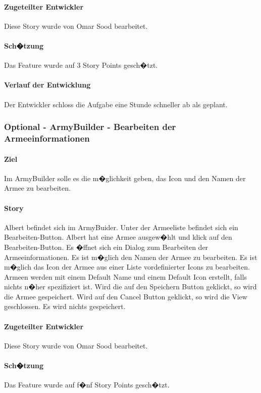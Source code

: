 \documentclass[12pt, titlepage]{scrartcl}
\begin{document}
			\paragraph{Zugeteilter Entwickler} Diese Story wurde von Omar Sood bearbeitet.
			\paragraph{Sch�tzung}
			Das Feature wurde auf 3 Story Points gesch�tzt.
			\paragraph{Verlauf der Entwicklung} 
			Der Entwickler schloss die Aufgabe eine Stunde schneller ab als geplant.
			
			\subsubsection{Optional - ArmyBuilder - Bearbeiten der Armeeinformationen}
			\paragraph{Ziel} Im ArmyBuilder solle es die m�glichkeit geben, das Icon und den Namen der Armee zu bearbeiten.
			\paragraph{Story}Albert befindet sich im ArmyBuider. Unter der Armeeliste befindet sich ein Bearbeiten-Button. Albert hat eine Armee ausgew�hlt und klick auf den Bearbeiten-Button. Es �ffnet sich ein Dialog zum Bearbeiten der Armeeinformationen. Es ist m�glich den Namen der Armee zu bearbeiten. Es ist m�glich das Icon der Armee aus einer Liste vordefinierter Icons zu bearbeiten. Armeen werden mit einem Default Name und einem Default Icon erstellt, falls nichts n�her spezifiziert ist. Wird die auf den Speichern Button geklickt, so wird die Armee gespeichert. Wird auf den Cancel Button geklickt, so wird die View geschlossen. Es wird nichts gespeichert.
			\paragraph{Zugeteilter Entwickler} Diese Story wurde von Omar Sood bearbeitet.
			\paragraph{Sch�tzung}
			Das Feature wurde auf f�nf Story Points gesch�tzt.
\end{document}
